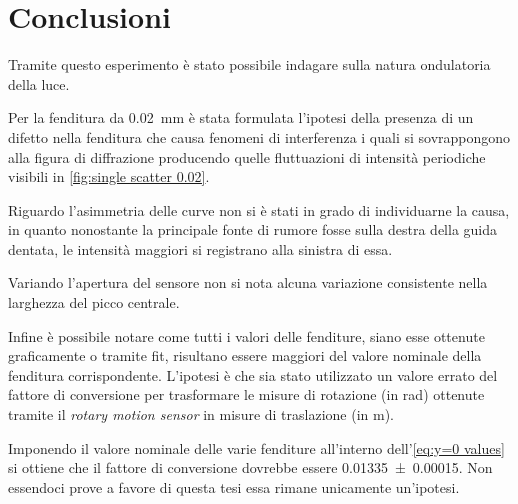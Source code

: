 \documentclass[../main.tex]{subfiles}
\begin{document}
\section{Conclusioni}

Tramite questo esperimento è stato possibile indagare sulla natura ondulatoria della luce.

Per la fenditura da \qty{0.02}{\mm} è stata formulata l'ipotesi della presenza di un difetto nella fenditura che causa fenomeni di interferenza i quali si sovrappongono alla figura di diffrazione producendo quelle fluttuazioni di intensità periodiche visibili in \autoref{fig:single scatter 0.02}.

Riguardo l'asimmetria delle curve non si è stati in grado di individuarne la causa, in quanto nonostante la principale fonte di rumore fosse sulla destra della guida dentata, le intensità maggiori si registrano alla sinistra di essa. %

Variando l'apertura del sensore non si nota alcuna variazione consistente nella larghezza del picco centrale.

Infine è possibile notare come tutti i valori delle fenditure, siano esse ottenute graficamente o tramite fit, risultano essere maggiori del valore nominale della fenditura corrispondente. L'ipotesi è che sia stato utilizzato un valore errato %
del fattore di conversione per trasformare le misure di rotazione (in \si{\radian}) ottenute tramite il \textit{rotary motion sensor} in misure di traslazione (in \si{\m}).

Imponendo il valore nominale delle varie fenditure all'interno dell'\autoref{eq:y=0 values} si ottiene che %
il fattore di conversione dovrebbe essere \num{0.01335+-0.00015}. Non essendoci prove a favore di questa tesi essa rimane unicamente un'ipotesi.
\end{document}
